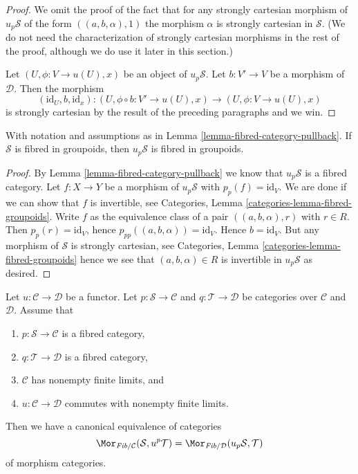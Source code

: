 \begin{proof}
\medskip\noindent
We omit the proof of the fact that for any strongly cartesian morphism
of $u_p\mathcal{S}$ of the form $((a, b, \alpha), 1)$ the morphism
$\alpha$ is strongly cartesian in $\mathcal{S}$.
(We do not need the characterization of strongly cartesian morphisms
in the rest of the proof, although we do use it later in this section.)

\medskip\noindent
Let $(U, \phi : V \to u(U), x)$ be an object of $u_p\mathcal{S}$.
Let $b : V' \to V$ be a morphism of $\mathcal{D}$. Then the morphism
$$
(\text{id}_U, b, \text{id}_x) :
(U, \phi \circ b : V' \to u(U), x)
\longrightarrow
(U, \phi : V \to u(U), x)
$$
is strongly cartesian by the result of the preceding paragraphs and we win.
\end{proof}

\begin{lemma}
\label{lemma-fibred-groupoids-category-pullback}
With notation and assumptions as in
Lemma \ref{lemma-fibred-category-pullback}.
If $\mathcal{S}$ is fibred in groupoids, then $u_p\mathcal{S}$ is fibred
in groupoids.
\end{lemma}

\begin{proof}
By
Lemma \ref{lemma-fibred-category-pullback}
we know that $u_p\mathcal{S}$ is a fibred category.
Let $f : X \to Y$ be a morphism of $u_p\mathcal{S}$ with
$p_p(f) = \text{id}_V$. We are done if we can show that $f$ is invertible, see
Categories, Lemma \ref{categories-lemma-fibred-groupoids}.
Write $f$ as the equivalence class of
a pair $((a, b, \alpha), r)$ with $r \in R$. Then $p_p(r) = \text{id}_V$,
hence $p_{pp}((a, b, \alpha)) = \text{id}_V$. Hence $b = \text{id}_V$.
But any morphism of $\mathcal{S}$ is strongly cartesian, see
Categories, Lemma \ref{categories-lemma-fibred-groupoids}
hence we see that $(a, b, \alpha) \in R$ is invertible
in $u_p\mathcal{S}$ as desired.
\end{proof}

\begin{lemma}
\label{lemma-adjointness-pullback-pushforward}
Let $u : \mathcal{C} \to \mathcal{D}$ be a functor.
Let $p : \mathcal{S} \to \mathcal{C}$ and $q : \mathcal{T} \to \mathcal{D}$
be categories over $\mathcal{C}$ and $\mathcal{D}$. Assume that
\begin{enumerate}
\item $p : \mathcal{S} \to \mathcal{C}$ is a fibred category,
\item $q : \mathcal{T} \to \mathcal{D}$ is a fibred category,
\item $\mathcal{C}$ has nonempty finite limits, and
\item $u : \mathcal{C} \to \mathcal{D}$ commutes with nonempty finite limits.
\end{enumerate}
Then we have a canonical equivalence of categories
$$
\Mor_{\textit{Fib}/\mathcal{C}}(\mathcal{S}, u^p\mathcal{T})
=
\Mor_{\textit{Fib}/\mathcal{D}}(u_p\mathcal{S}, \mathcal{T})
$$
of morphism categories.
\end{lemma}

